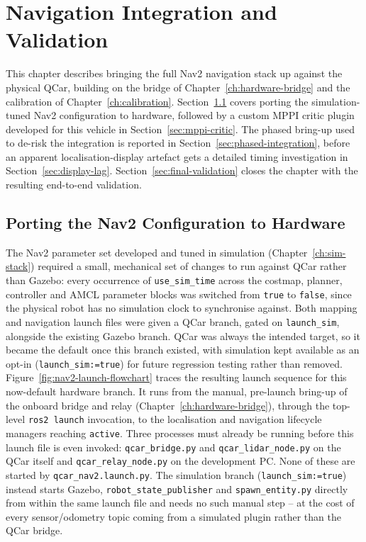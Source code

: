 \chapter{Navigation Integration and Validation}
\label{ch:nav-integration}

This chapter describes bringing the full Nav2 navigation stack up
against the physical QCar, building on the bridge of
Chapter~\ref{ch:hardware-bridge} and the calibration of
Chapter~\ref{ch:calibration}. Section~\ref{sec:nav2-porting} covers
porting the simulation-tuned Nav2 configuration to hardware, followed
by a custom MPPI critic plugin developed for this vehicle in
Section~\ref{sec:mppi-critic}. The phased bring-up used to de-risk the
integration is reported in Section~\ref{sec:phased-integration},
before an apparent localisation-display artefact gets a detailed
timing investigation in Section~\ref{sec:display-lag}.
Section~\ref{sec:final-validation} closes the chapter with the
resulting end-to-end validation.

\section{Porting the Nav2 Configuration to Hardware}
\label{sec:nav2-porting}

The Nav2 parameter set developed and tuned in simulation
(Chapter~\ref{ch:sim-stack}) required a small, mechanical set of
changes to run against QCar rather than Gazebo: every
occurrence of \texttt{use\_sim\_time} across the costmap, planner,
controller and AMCL parameter blocks was switched from \texttt{true}
to \texttt{false}, since the physical robot has no simulation clock to
synchronise against. Both mapping and navigation launch files were
given a QCar branch, gated on \texttt{launch\_sim}, alongside the
existing Gazebo branch. QCar was always the intended target, so it
became the default once this branch existed, with simulation kept
available as an opt-in (\texttt{launch\_sim:=true}) for future
regression testing rather than removed.
Figure~\ref{fig:nav2-launch-flowchart} traces the resulting launch
sequence for this now-default hardware branch. It runs from the
manual, pre-launch bring-up of the onboard bridge and relay
(Chapter~\ref{ch:hardware-bridge}), through the top-level
\texttt{ros2 launch} invocation, to the localisation and navigation
lifecycle managers reaching \texttt{active}. Three processes must
already be running before this launch file is even invoked:
\texttt{qcar\_bridge.py} and \texttt{qcar\_lidar\_node.py} on the QCar
itself and \texttt{qcar\_relay\_node.py} on the development PC. None
of these are started by \texttt{qcar\_nav2.launch.py}. The simulation
branch (\texttt{launch\_sim:=true}) instead starts Gazebo,
\texttt{robot\_state\_publisher} and \texttt{spawn\_entity.py}
directly from within the same launch file and needs no such manual
step -- at the cost of every sensor/odometry topic coming from a
simulated plugin rather than the QCar bridge.

